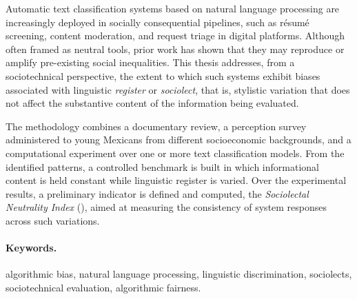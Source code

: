 Automatic text classification systems based on natural language processing are
increasingly deployed in socially consequential pipelines, such as résumé
screening, content moderation, and request triage in digital platforms.
Although often framed as neutral tools, prior work has shown that they may
reproduce or amplify pre-existing social inequalities. This thesis addresses,
from a sociotechnical perspective, the extent to which such systems exhibit
biases associated with linguistic \emph{register} or \emph{sociolect}, that
is, stylistic variation that does not affect the substantive content of the
information being evaluated.

The methodology combines a documentary review, a perception survey administered
to young Mexicans from different socioeconomic backgrounds, and a computational
experiment over one or more text classification models. From the identified
patterns, a controlled benchmark is built in which informational content is
held constant while linguistic register is varied. Over the experimental
results, a preliminary indicator is defined and computed, the
\emph{Sociolectal Neutrality Index} (\INS), aimed at measuring the consistency
of system responses across such variations.

\paragraph{Keywords.} algorithmic bias, natural language processing, linguistic
discrimination, sociolects, sociotechnical evaluation, algorithmic fairness.

\cleardoublepage
